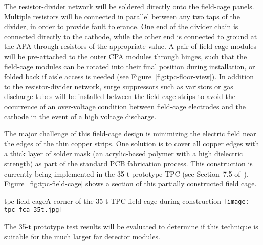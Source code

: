 The resistor-divider network will be soldered directly onto the
field-cage panels. Multiple resistors will be connected in parallel
between any two taps of the divider, in order to provide fault
tolerance.  One end of the divider chain is connected directly to the
cathode, while the other end is connected to ground at the APA through
resistors of the appropriate value.  A pair of field-cage modules will
be pre-attached to the outer CPA modules through hinges, such that the
field-cage modules can be rotated into their final position during
installation, or folded back if aisle access is needed (see
Figure~\ref{fig:tpc-floor-view}).  In addition to the resistor-divider
network, surge suppressors such as varistors or gas discharge tubes
will be installed between the field-cage strips to avoid the
occurrence of an over-voltage condition between field-cage electrodes
and the cathode in the event of a high voltage discharge.

The major challenge of this field-cage design is minimizing the
electric field near the edges of the thin copper strips.  One solution
is to cover all copper edges with a thick layer of solder mask (an
acrylic-based polymer with a high dielectric strength) as part of the
standard PCB fabrication process.  This construction is currently
being implemented in the 35-t prototype TPC (see Section~7.5 of~\cite{cdr-annex-lbne-design}).  Figure~\ref{fig:tpc-field-cage} shows a section of this
partially constructed field cage.
\begin{cdrfigure}{tpc-field-cage}{A corner of the 35-t TPC 
field cage during construction}
\texttt{[image: tpc\_fca\_35t.jpg]}
\end{cdrfigure}
The 35-t prototype test results will be evaluated to determine if this
technique is suitable for the much larger far detector modules.
 
